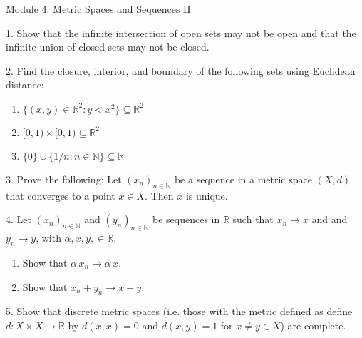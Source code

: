 \documentclass{article}
\theoremstyle{remark} %
\newcommand{\R}{{\mathbb{R}}}
\newcommand{\N}{{\mathbb{N}}}
\begin{document}
\begin{center}
\Large{Module 4: Metric Spaces and Sequences II}
\end{center}

1. Show that the infinite intersection of open sets may not be open and that the infinite union of closed sets may not be closed.
\vspace{9.5cm} %



2.  Find the closure, interior, and boundary of the following sets using Euclidean distance:
    \begin{enumerate}
        \item[(i)] $\{(x,y)\in \R^2 : y < x^2 \} \subseteq \R^2$
        \item[(ii)]  $[0,1)\times[0,1) \subseteq \R^2$
        \item[(iii)] $\{0 \} \cup  \{1/n \colon n \in \N\} \subseteq \R$ 
    \end{enumerate}

\vspace{10cm} %




3. Prove the following: Let $(x_n)_{n\in\N}$ be a sequence in a metric space $(X,d)$ that converges to a point $x \in X$. Then $x$ is unique.

\vspace{11cm} %



4. Let $(x_n)_{n \in \N}$ and $(y_n)_{n \in \N}$ be sequences in $\R$ such that $x_n \to x$ and and $y_n \to y$, with $\alpha, x,y, \in \R$. 
    \begin{enumerate}
        \item[(i)] Show that $\alpha \, x_n \to \alpha \, x$.
        \item[(i)] Show that $x_n + y_n \to x + y$.
    \end{enumerate}

\vspace{11cm} %




5. Show that discrete metric spaces (i.e. those with the metric defined as define $d\colon X \times X \to \R$ by $d(x,x) = 0$ and $d(x,y)=1$ for $x\neq y \in X$) are complete. 
\vspace{11cm} %

\end{document}

